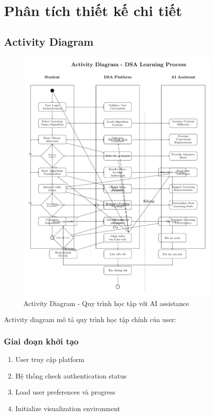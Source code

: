 \documentclass[12pt,a4paper]{article}
\begin{document}
\section{Phân tích thiết kế chi tiết}

\subsection{Activity Diagram}

\begin{figure}[H]
\centering
\includegraphics[width=0.9\textwidth]{diagrams/activity_diagram.pdf}
\caption{Activity Diagram - Quy trình học tập với AI assistance}
\label{fig:activity_diagram}
\end{figure}

Activity diagram mô tả quy trình học tập chính của user:

\subsubsection{Giai đoạn khởi tạo}
\begin{enumerate}
    \item User truy cập platform
    \item Hệ thống check authentication status
    \item Load user preferences và progress
    \item Initialize visualization environment
\end{enumerate}
\end{document}
